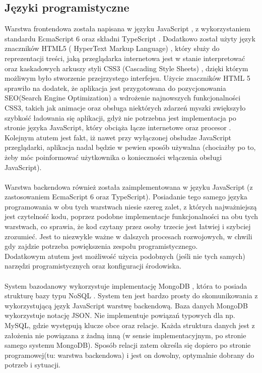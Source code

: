 \documentclass[eng,printmode]{mgr}
\begin{document}
\subsection{Języki programistyczne}
Warstwa frontendowa została napisana w języku JavaScript \cite{JS}, z wykorzystaniem standardu EcmaScript 6 \cite{ES6} oraz składni TypeScript \cite{TS}. Dodatkowo został użyty język znaczników HTML5 ( HyperText Markup Language) \cite{HTML5}, który służy do reprezentacji treści, jaką przeglądarka internetowa jest w stanie interpretować oraz kaskadowych arkuszy styli CSS3 (Cascading Style Sheets) \cite{CSS3}, dzięki którym możliwym było stworzenie przejrzystego interfejsu. Użycie znaczników HTML 5 sprawiło na dodatek, że aplikacja jest przygotowana do pozycjonowania SEO(Search Engine Optimization) \cite{HTML_SEO} a wdrożenie najnowszych funkcjonalności CSS3, takich jak animacje oraz obsługa niektórych zdarzeń myszki zwiększyło szybkość ładowania się aplikacji, gdyż nie potrzebna jest implementacja po stronie języka JavaScript, który obciąża łącze internetowe oraz procesor \cite{JS_CPU}. Kolejnym atutem jest fakt, iż nawet przy wyłączonej obsłudze JavaScript przeglądarki, aplikacja nadal będzie w pewien sposób używalna (chociażby po to, żeby móc poinformować użytkownika o konieczności włączenia obsługi JavaScript).
\\
\\
Warstwa backendowa również została zaimplementowana w języku JavaScript (z zastosowaniem EcmaScript 6 oraz TypeScript). Posiadanie tego samego języka programowania w obu tych warstwach niesie szereg zalet, z których najważniejszą jest czytelność kodu, poprzez podobne implementacje funkcjonalności na obu tych warstwach, co sprawia, że kod czytany przez osoby trzecie jest łatwiej i szybciej zrozumieć. Jest to niezwykle ważne w dalszych procesach rozwojowych, w chwili gdy zajdzie potrzeba powiększenia zespołu programistycznego.
\\
Dodatkowym atutem jest możliwość użycia podobnych (jeśli nie tych samych) narzędzi programistycznych oraz konfiguracji środowiska.
\\
\\
System bazodanowy wykorzystuje implementację MongoDB \cite{MongoDB}, która to posiada strukturę bazy typu NoSQL \cite{NO_SQL}. System ten jest bardzo prosty do skomunikowania z wykorzystującą język JavaScript warstwę backendową. Baza danych MongoDB wykorzystuje notację JSON. Nie implementuje powiązań typowych dla np. MySQL, gdzie występują klucze obce oraz relacje. Każda struktura danych jest z założenia nie powiązana z żadną inną (w sensie implementacyjnym, po stronie samego systemu MongoDB). Sposób relacji zatem określa się dopiero po stronie programowej(tu: warstwa backendowa) i jest on dowolny, optymalnie dobrany do potrzeb i sytuacji.
\end{document}
